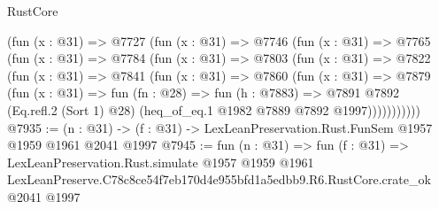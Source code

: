 \begin{lexlean}{RustCore}
\begin{coremodule}
    (fun (x : @31) =>
    @7727
      (fun (x : @31) =>
      @7746
        (fun (x : @31) =>
        @7765
          (fun (x : @31) =>
          @7784
            (fun (x : @31) =>
            @7803
              (fun (x : @31) =>
              @7822
                (fun (x : @31) =>
                @7841
                  (fun (x : @31) =>
                  @7860
                    (fun (x : @31) =>
                    @7879
                      (fun (x : @31) =>
                      fun (fn : @28) =>
                      fun (h : @7883) =>
                      @7891
                        @7892
                        (Eq.refl.{2} (Sort 1) @28)
                        (heq_of_eq.{1} @1982 @7889 @7892 @1997)))))))))))
@7935 := (n : @31) -> (f : @31) -> LexLeanPreservation.Rust.FunSem @1957 @1959 @1961 @2041 @1997
@7945 := fun (n : @31) =>
  fun (f : @31) =>
  LexLeanPreservation.Rust.simulate
    @1957
    @1959
    @1961
    LexLeanPreserve.C78c8ce54f7eb170d4e955bfd1a5edbb9.R6.RustCore.crate_ok
    @2041
    @1997
\end{coremodule}
\end{lexlean}
